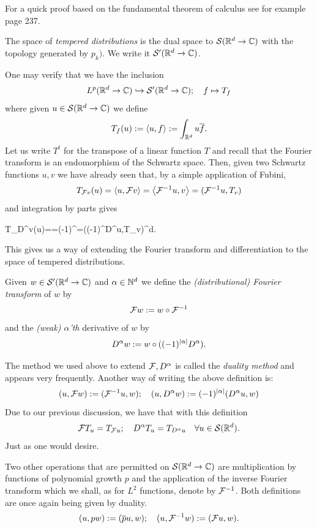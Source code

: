 \documentclass[
    a4paper,
    DIV=14,
    abstract=true,
    numbers=noenddot
]{scrartcl}
\begin{document}
For a quick proof based on the
fundamental theorem of calculus see for example \cite{Foll} page 237.
\begin{definition}
	The space of \emph{tempered distributions} is the dual space to $\mathcal{S}(\mathbb{R}^d\to\mathbb{C})$ with the topology generated by $p_k)$. We write it $\mathcal{S}'(\mathbb{R}^d\to\mathbb{C})$.
\end{definition}
One may verify that we have the inclusion
\begin{align}\label{lpisdistr}
	L^p(\mathbb{R}^d\to\mathbb{C})\hookrightarrow\mathcal{S}'(\mathbb{R}^d\to\mathbb{C});\quad f\mapsto T_f
\end{align}
where given $u\in \mathcal{S}(\mathbb{R}^d\to\mathbb{C})$ we define \[T_f(u):=\left\langle u,f\right\rangle:=\int_{\mathbb{R}^d} u\overline{f}.\]
Let us write $T^t$  for the transpose of a linear function $T$ and recall that the Fourier transform is an endomorphism of the Schwartz space. Then, given two Schwartz functions $u,v$ we have already seen that, by a simple application of Fubini,
\[T_{\mathcal{F} v}(u)=\left\langle u,\mathcal{F} v\right\rangle=\left\langle\mathcal{F}^{-1} u,v\right\rangle=(\mathcal{F}^{-1}u,T_v)\]
and integration by parts gives
\begin{aligneq*}
	T_{D^\alpha v}(u)==(-1)^{\abs{\alpha}}=((-1)^{\abs{\alpha}}D^\alpha u,T_v)\quad\forall{\alpha}\in \N^d.
\end{aligneq*}


\bigbreak
This gives us a way of extending the Fourier transform and differentiation to the space of tempered distributions.
\begin{definition}
	Given $w\in\mathcal{S}'(\mathbb{R}^d\to\mathbb{C})$ and $\alpha\in\mathbb{N}^d$ we define the \emph{(distributional) Fourier transform} of $w$ by
	\[\mathcal{F} w:= w\circ \mathcal{F}^{-1}\]
	and the \emph{(weak) $\alpha$'th} derivative of $w$ by
	\[D^\alpha w:= w\circ((-1)^{\left| \alpha \right|}D^\alpha).\]

\end{definition}
The method we used above to extend $\mathcal{F}, D^\alpha$ is called the \emph{duality method} and appears very frequently. Another way of writing the above definition is:
\begin{equation*}
	(u, \mathcal{F} w):=(\mathcal{F}^{-1} u, w);\quad(u,D^\alpha w):=(-1)^{\left| \alpha \right|}(D^\alpha u,w)
\end{equation*}
Due to our previous discussion, we have that with this definition
\begin{equation}\label{ftlpdistr}
	\mathcal{F} T_u=T_{\mathcal{F} u};\quad D^\alpha T_{u}=T_{D^\alpha u}\quad\forall u\in \mathcal{S}(\mathbb{R}^d).
\end{equation}
Just as one would desire.\bigbreak

Two other operations that are permitted on $\mathcal{S}(\mathbb{R}^d\to\mathbb{C})$ are multiplication by functions of polynomial growth $p$ and the application of the inverse Fourier transform which we shall, as for $L^2$ functions, denote by $\mathcal{F}^{-1}$. Both definitions are once again being given by duality.
\begin{equation*}
	(u,pw):=(\overline{p}u,w);\quad (u,\mathcal{F}^{-1}w):=(\mathcal{F} u,w) .
\end{equation*}
\end{document}
